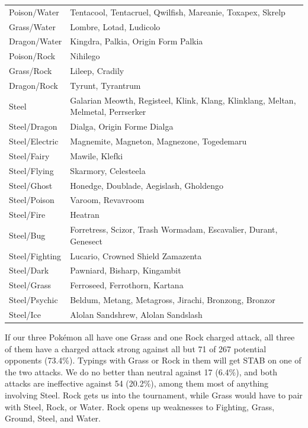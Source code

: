 \begin{table}
\begin{tabular}{lp{.7\linewidth}}
Poison/Water & Tentacool, Tentacruel, Qwilfish, Mareanie, Toxapex, Skrelp\\
Grass/Water & Lombre, Lotad, Ludicolo\\
Dragon/Water & Kingdra, Palkia, Origin Form Palkia\\
Poison/Rock & Nihilego\\
Grass/Rock & Lileep, Cradily\\
Dragon/Rock & Tyrunt, Tyrantrum\\
Steel & Galarian Meowth, Registeel, Klink, Klang, Klinklang, Meltan, Melmetal, Perrserker\\
Steel/Dragon & Dialga, Origin Forme Dialga\\
Steel/Electric & Magnemite, Magneton, Magnezone, Togedemaru \\
Steel/Fairy & Mawile, Klefki\\
Steel/Flying & Skarmory, Celesteela \\
Steel/Ghost & Honedge, Doublade, Aegislash, Gholdengo\\
Steel/Poison & Varoom, Revavroom\\
Steel/Fire & Heatran\\
Steel/Bug & Forretress, Scizor, Trash Wormadam, Escavalier, Durant, Genesect\\
Steel/Fighting & Lucario, Crowned Shield Zamazenta\\
Steel/Dark & Pawniard, Bisharp, Kingambit\\
Steel/Grass & Ferroseed, Ferrothorn, Kartana\\
Steel/Psychic & Beldum, Metang, Metagross, Jirachi, Bronzong, Bronzor\\
Steel/Ice & Alolan Sandshrew, Alolan Sandslash\\
\end{tabular}
\end{table}

If our three Pokémon all have one Grass and one Rock charged attack,
  all three of them have a charged attack strong against all but
  71 of 267 potential opponents (73.4\%).
Typings with Grass or Rock in them will get STAB on one of the two attacks.
We do no better than neutral against 17 (6.4\%), and both attacks are
  ineffective against 54 (20.2\%), among them most of anything involving
  Steel.
Rock gets us into the tournament, while Grass would have to pair with Steel,
  Rock, or Water.
Rock opens up weaknesses to Fighting, Grass, Ground, Steel, and Water.

